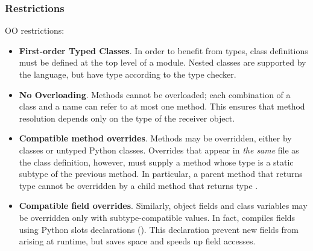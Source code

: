 \documentclass[a4paper,english,cleveref,autoref,thm-restate,anonymous,]{lipics-v2021}
\begin{document}
\subsubsection{Restrictions}

OO restrictions:

\begin{itemize}
  \item \textbf{First-order Typed Classes}.
    In order to benefit from types, class definitions must be defined at the top level of a module.
    Nested classes are supported by the language, but have type  according
    to the type checker.

  \item \textbf{No Overloading}.
    Methods cannot be overloaded; each combination of a class
    and a name can refer to at most one method.
    This ensures that method resolution depends only on the
    type of the receiver object.


  \item \textbf{Compatible method overrides}.
    Methods may be overridden, either by \SP{} classes or
    untyped Python classes.
    Overrides that appear in \emph{the same} \SP{} file as the class definition, however,
    must supply a method whose type is a static subtype of the previous method.
    In particular, a parent method that returns type  cannot be
    overridden by a child method that returns type .


  \item \textbf{Compatible field overrides}.
    Similarly, object fields and class variables may be overridden
    only with subtype-compatible values.
    In fact, \SP{} compiles fields using Python slots
    declarations ().
    This declaration prevent new fields from arising at runtime,
    but saves space and speeds up field accesses.


\end{itemize}
\end{document}
